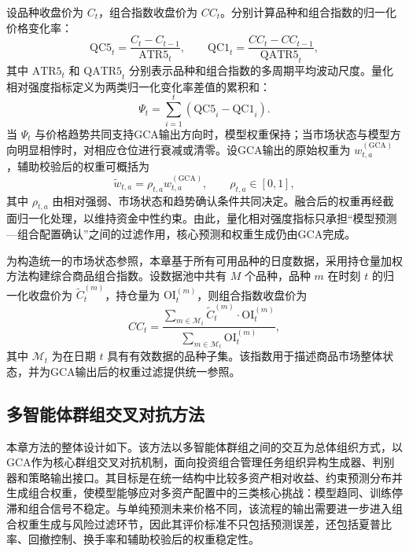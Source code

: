 设品种收盘价为 $C_t$，组合指数收盘价为 $CC_t$。分别计算品种和组合指数的归一化价格变化率：
\begin{equation}
\text{QC5}_t = \frac{C_t - C_{t-1}}{\text{ATR5}_t}, \qquad \text{QC1}_t = \frac{CC_t - CC_{t-1}}{\text{QATR5}_t},
\end{equation}
其中 $\text{ATR5}_t$ 和 $\text{QATR5}_t$ 分别表示品种和组合指数的多周期平均波动尺度。量化相对强度指标定义为两类归一化变化率差值的累积和：
\begin{equation}
\Psi_t = \sum_{i=1}^{t}\left(\text{QC5}_i - \text{QC1}_i\right).
\end{equation}
当 $\Psi_t$ 与价格趋势共同支持GCA输出方向时，模型权重保持；当市场状态与模型方向明显相悖时，对相应仓位进行衰减或清零。设GCA输出的原始权重为 $w_{t,a}^{(\text{GCA})}$，辅助校验后的权重可概括为
\begin{equation}
\tilde{w}_{t,a}=\rho_{t,a} w_{t,a}^{(\text{GCA})}, \qquad \rho_{t,a}\in[0,1],
\end{equation}
其中 $\rho_{t,a}$ 由相对强弱、市场状态和趋势确认条件共同决定。融合后的权重再经截面归一化处理，以维持资金中性约束。由此，量化相对强度指标只承担“模型预测—组合配置确认”之间的过滤作用，核心预测和权重生成仍由GCA完成。

\label{sec:composite_index}
为构造统一的市场状态参照，本章基于所有可用品种的日度数据，采用持仓量加权方法构建综合商品组合指数。设数据池中共有 $M$ 个品种，品种 $m$ 在时刻 $t$ 的归一化收盘价为 $\tilde{C}_t^{(m)}$，持仓量为 $\text{OI}_t^{(m)}$，则组合指数收盘价为
\begin{equation}
CC_t = \frac{\sum_{m \in \mathcal{M}_t} \tilde{C}_t^{(m)} \cdot \text{OI}_t^{(m)}}{\sum_{m \in \mathcal{M}_t} \text{OI}_t^{(m)}},
\end{equation}
其中 $\mathcal{M}_t$ 为在日期 $t$ 具有有效数据的品种子集。该指数用于描述商品市场整体状态，并为GCA输出后的权重过滤提供统一参照。

\subsection{多智能体群组交叉对抗方法}



本章方法的整体设计如下。该方法以多智能体群组之间的交互为总体组织方式，以GCA作为核心群组交叉对抗机制，面向投资组合管理任务组织异构生成器、判别器和策略输出接口。其目标是在统一结构中比较多资产相对收益、约束预测分布并生成组合权重，使模型能够应对多资产配置中的三类核心挑战：模型趋同、训练停滞和组合信号不稳定。与单纯预测未来价格不同，该流程的输出需要进一步进入组合权重生成与风险过滤环节，因此其评价标准不只包括预测误差，还包括夏普比率、回撤控制、换手率和辅助校验后的权重稳定性。

